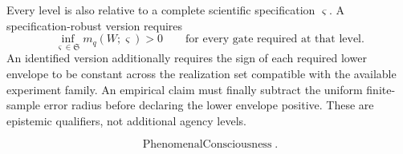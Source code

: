 
Every level is also relative to a complete scientific specification
\(\varsigma\). A specification-robust version requires
\[
\inf_{\varsigma\in\mathfrak S}
 m_q(W;\varsigma)>0
\qquad
\text{for every gate required at that level}.
\]
An identified version additionally requires the sign of each required lower
envelope to be constant across the realization set compatible with the
available experiment family. An empirical claim must finally subtract the
uniform finite-sample error radius before declaring the lower envelope
positive. These are epistemic qualifiers, not additional agency levels.

\[
\operatorname{PhenomenalConsciousness}.
\]
